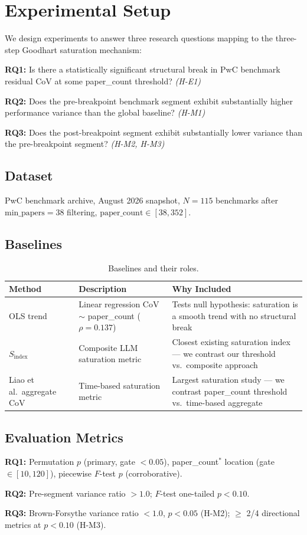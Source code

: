 \section{Experimental Setup}
\label{sec:setup}

We design experiments to answer three research questions mapping to the three-step Goodhart saturation mechanism:

\textbf{RQ1:} Is there a statistically significant structural break in PwC benchmark residual CoV at some paper\_count threshold? \textit{(H-E1)}

\textbf{RQ2:} Does the pre-breakpoint benchmark segment exhibit substantially higher performance variance than the global baseline? \textit{(H-M1)}

\textbf{RQ3:} Does the post-breakpoint segment exhibit substantially lower variance than the pre-breakpoint segment? \textit{(H-M2, H-M3)}

\subsection{Dataset}

PwC benchmark archive, August 2026 snapshot, $N=115$ benchmarks after $\text{min\_papers}=38$ filtering, $\text{paper\_count} \in [38, 352]$.

\subsection{Baselines}

\begin{table}[h]
\centering
\caption{Baselines and their roles.}
\label{tab:baselines}
\begin{tabular}{lp{4cm}p{4cm}}
\toprule
Method & Description & Why Included \\
\midrule
OLS trend & Linear regression CoV $\sim$ paper\_count ($\rho=0.137$) & Tests null hypothesis: saturation is a smooth trend with no structural break \\
$S_{\text{index}}$~\cite{Akhtar2026} & Composite LLM saturation metric & Closest existing saturation index --- we contrast our threshold vs.\ composite approach \\
Liao et al.\ aggregate CoV~\cite{Liao2022} & Time-based saturation metric & Largest saturation study --- we contrast paper\_count threshold vs.\ time-based aggregate \\
\bottomrule
\end{tabular}
\end{table}

\subsection{Evaluation Metrics}

\textbf{RQ1:} Permutation $p$ (primary, gate $< 0.05$), paper\_count$^*$ location (gate $\in [10, 120]$), piecewise $F$-test $p$ (corroborative).

\textbf{RQ2:} Pre-segment variance ratio $> 1.0$; $F$-test one-tailed $p < 0.10$.

\textbf{RQ3:} Brown-Forsythe variance ratio $< 1.0$, $p < 0.05$ (H-M2); $\geq$ 2/4 directional metrics at $p < 0.10$ (H-M3).
